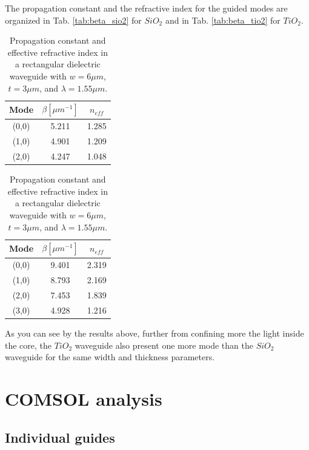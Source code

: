 \documentclass[a4paper,12pt]{article}
\begin{document}
The propagation constant and the refractive index for the guided modes are organized in Tab. \ref{tab:beta_sio2} for $SiO_2$ and in Tab. \ref{tab:beta_tio2} for $TiO_2$.

\begin{table}[H]
    \centering
    \begin{subtable}{0.45\textwidth}
        \centering
        \begin{tabular}{ccc}
            \toprule
            Mode & $\beta [\mu m^{-1}]$ & $n_{eff}$ \\
            \midrule
            (0,0) & 5.211 & 1.285 \\
            (1,0) & 4.901 & 1.209 \\
            (2,0) & 4.247 & 1.048 \\
            \bottomrule
        \end{tabular}
        \caption{$SiO_2$.}
    \end{subtable}
    \hfill
    \begin{subtable}{0.45\textwidth}
        \centering
        \begin{tabular}{ccc}
            \toprule
            Mode & $\beta [\mu m^{-1}]$ & $n_{eff}$ \\
            \midrule
            (0,0) & 9.401 & 2.319 \\
            (1,0) & 8.793 & 2.169 \\
            (2,0) & 7.453 & 1.839 \\
            (3,0) & 4.928 & 1.216 \\
            \bottomrule
        \end{tabular}
        \caption{$TiO_2$.}
        \label{tab:modes_d5um}
    \end{subtable}
    \caption{Propagation constant and effective refractive index in a rectangular dielectric waveguide with $w = 6 \mu m$, $t = 3\mu m$, and $\lambda = 1.55 \mu m$.}
\end{table}

As you can see by the results above, further from confining more the light inside the core, the $TiO_2$ waveguide also present one more mode than the $SiO_2$ waveguide for the same width and thickness parameters.

\section{COMSOL analysis}
\label{sec:comsol}

\subsection{Individual guides}
\label{subsec:individual_guides}
\end{document}
